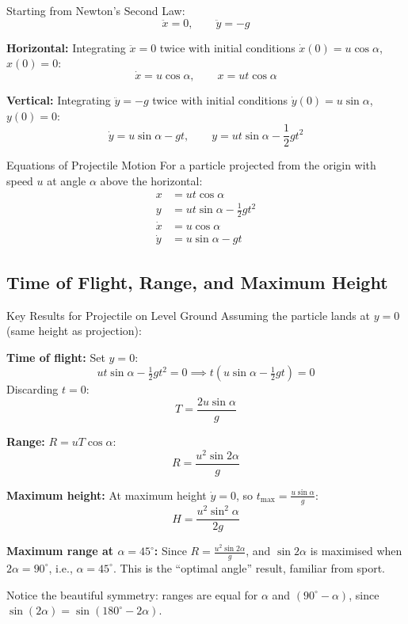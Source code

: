 \documentclass[12pt, a4paper]{book}
\begin{document}
Starting from Newton's Second Law:
\[
  \ddot{x} = 0, \qquad \ddot{y} = -g
\]

\textbf{Horizontal:} Integrating $\ddot{x} = 0$ twice with initial conditions $\dot{x}(0) = u\cos\alpha$, $x(0) = 0$:
\[
  \dot{x} = u\cos\alpha, \qquad x = ut\cos\alpha
\]

\textbf{Vertical:} Integrating $\ddot{y} = -g$ twice with initial conditions $\dot{y}(0) = u\sin\alpha$, $y(0) = 0$:
\[
  \dot{y} = u\sin\alpha - gt, \qquad y = ut\sin\alpha - \frac{1}{2}gt^2
\]

\begin{thm}{Equations of Projectile Motion}{}
For a particle projected from the origin with speed $u$ at angle $\alpha$ above the horizontal:
\begin{align}
  x &= ut\cos\alpha \label{eq:proj_x}\\
  y &= ut\sin\alpha - \tfrac{1}{2}gt^2 \label{eq:proj_y}\\
  \dot{x} &= u\cos\alpha \label{eq:proj_vx}\\
  \dot{y} &= u\sin\alpha - gt \label{eq:proj_vy}
\end{align}
\end{thm}

\subsection{Time of Flight, Range, and Maximum Height}

\begin{thm}{Key Results for Projectile on Level Ground}{}
Assuming the particle lands at $y = 0$ (same height as projection):

\medskip
\textbf{Time of flight:} Set $y = 0$:
\[
  ut\sin\alpha - \tfrac{1}{2}gt^2 = 0 \implies t(u\sin\alpha - \tfrac{1}{2}gt) = 0
\]
Discarding $t = 0$:
\[
  \boxed{T = \frac{2u\sin\alpha}{g}}
\]

\textbf{Range:} $R = uT\cos\alpha$:
\[
  \boxed{R = \frac{u^2\sin 2\alpha}{g}}
\]

\textbf{Maximum height:} At maximum height $\dot{y} = 0$, so $t_{\max} = \tfrac{u\sin\alpha}{g}$:
\[
  \boxed{H = \frac{u^2\sin^2\alpha}{2g}}
\]
\end{thm}

\begin{intuitionbox}
\textbf{Maximum range at $\alpha = 45^\circ$:} Since $R = \frac{u^2\sin 2\alpha}{g}$, and $\sin 2\alpha$ is maximised when $2\alpha = 90^\circ$, i.e., $\alpha = 45^\circ$. This is the ``optimal angle'' result, familiar from sport. 

Notice the beautiful symmetry: ranges are equal for $\alpha$ and $(90^\circ - \alpha)$, since $\sin(2\alpha) = \sin(180^\circ - 2\alpha)$.
\end{intuitionbox}
\end{document}
